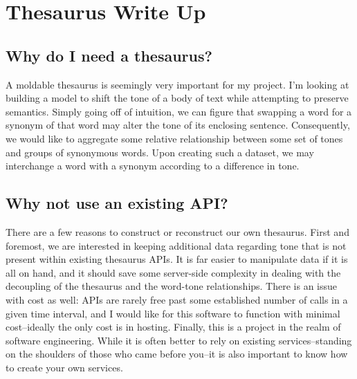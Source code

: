 \documentclass[11pt, twoside, reqno]{book}
\begin{document}
\startmain
\chapter{Thesaurus Write Up}


\section{Why do I need a thesaurus?}

A moldable thesaurus is seemingly very important for my project. I'm looking at building a model to shift the tone of a body of text while attempting to preserve semantics. Simply going off of intuition, we can figure that swapping a word for a synonym of that word may alter the tone of its enclosing sentence. Consequently, we would like to aggregate some relative relationship between some set of tones and groups of synonymous words. Upon creating such a dataset, we may interchange a word with a synonym according to a difference in tone.

\section{Why not use an existing API?}

There are a few reasons to construct or reconstruct our own thesaurus. First and foremost, we are interested in keeping additional data regarding tone that is not present within existing thesaurus APIs. It is far easier to manipulate data if it is all on hand, and it should save some server-side complexity in dealing with the decoupling of the thesaurus and the word-tone relationships. There is an issue with cost as well: APIs are rarely free past some established number of calls in a given time interval, and I would like for this software to function with minimal cost--ideally the only cost is in hosting. Finally, this is a project in the realm of software engineering. While it is often better to rely on existing services--standing on the shoulders of those who came before you--it is also important to know how to create your own services.
\end{document}
